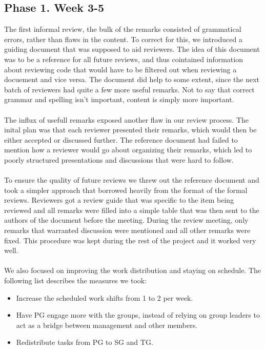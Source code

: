 \documentclass{article}
\begin{document}
    \subsection{Phase 1. Week 3-5} 
        The first informal review, the bulk of the remarks consisted of grammatical errors, rather 
        than flaws in the  content. To correct for this, we introduced a guiding document that was 
        supposed to aid reviewers. The idea of this document was to be a reference for all future reviews, and 
        thus cointained information about reviewing code that would have to be filtered out when 
        reviewing a docuement and vice versa. The document did help to some extent, since the next 
        batch of reviewers had quite a few more useful remarks. Not to say that correct grammar and 
        spelling isn't important, content is simply more important. 
        \\ \\
        The influx of usefull remarks exposed another flaw in our review process. The inital plan was 
        that each reviewer presented their remarks, which would then be either accepted or discussed further. 
        The reference document had failed to mention how a reviewer would go about organizing their 
        remarks, which led to poorly structured presentations and discussions that were hard to follow. 
        \\ \\
        To ensure the quality of future reviews we threw out the reference document and took a simpler 
        approach that borrowed heavily from the format of the formal reviews. Reviewers got a review 
        guide that was specific to the item being reviewed and all remarks were filled into a simple 
        table that was then sent to the authors of the document before the meeting. During the review meeting, 
        only remarks that warranted discussion were mentioned and all other remarks were fixed. This 
        procedure was kept during the rest of the project and it worked very well. 
        \\ \\
        We also focused on improving the work distribution and staying on schedule. The following list 
        describes the measures we took: 
        \begin{itemize}
            \item Increase the scheduled work shifts from 1 to 2 per week.
            \item Have PG engage more with the groups, instead of relying on group leaders to act as a 
            bridge between management and other members. 
            \item Redistribute tasks from PG to SG and TG. 
        \end{itemize}
        
\end{document}
